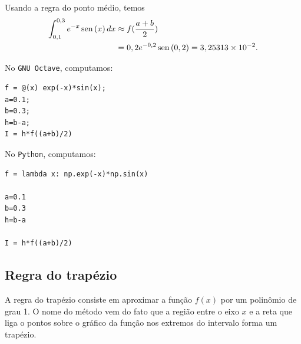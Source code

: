 \begin{ex}
  Usando a regra do ponto médio, temos
  \begin{equation}
    \begin{split}
    \int_{0,1}^{0,3} e^{-x}\operatorname{sen}\,(x)\,dx &\approx f(\frac{a+b}{2}) \\
    &= 0,2e^{-0,2}\operatorname{sen}\,(0,2) = 3,25313\times 10^{-2}.
    \end{split}
  \end{equation}

\ifisscilab
\construirScilab
\fi
\ifisoctave
No \verb+GNU Octave+, computamos:
\begin{verbatim}
f = @(x) exp(-x)*sin(x);
a=0.1;
b=0.3;
h=b-a;
I = h*f((a+b)/2)
\end{verbatim}
\fi
\ifispython
No \verb+Python+, computamos:
\begin{verbatim}
f = lambda x: np.exp(-x)*np.sin(x)

a=0.1
b=0.3
h=b-a

I = h*f((a+b)/2)
\end{verbatim}
\fi
\end{ex}



\subsection{Regra do trapézio}\label{sec:trapezio}

A regra do trapézio consiste em aproximar a função $f(x)$ por um polinômio de grau 1. O nome do método vem do fato que a região entre o eixo $x$ e a reta que liga o pontos sobre o gráfico da função nos extremos do intervalo forma um trapézio.


